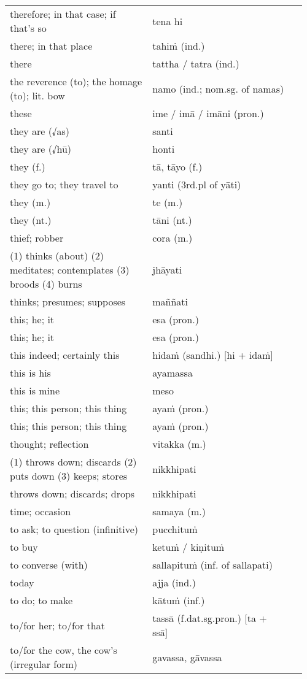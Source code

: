 \documentclass[a5paper]{memoir}
\begin{document}
\begin{longtable}{L{0.48\linewidth} L{0.48\linewidth} H}
therefore; in that case; if that's so & tena hi & \\
there; in that place & tahiṁ (ind.) & \\
there & tattha / tatra (ind.) & \\
the reverence (to); the homage (to); lit. bow & namo (ind.; nom.sg. of namas) & \\
these & ime / imā / imāni (pron.) & \\
they are (√as) & santi & \\
they are (√hū) & honti & \\
they (f.) & tā, tāyo (f.) & \\
they go to; they travel to & yanti (3rd.pl of yāti) & \\
they (m.) & te (m.) & \\
they (nt.) & tāni (nt.) & \\
thief; robber & cora (m.) & \\
(1) thinks (about) (2) meditates; contemplates (3) broods (4) burns & jhāyati & \\
thinks; presumes; supposes & maññati & \\
this; he; it & esa (pron.) & \\
this; he; it & esa (pron.) & \\
this indeed; certainly this & hidaṁ (sandhi.) [hi + idaṁ] & \\
this is his & ayamassa & \\
this is mine & meso & \\
this; this person; this thing & ayaṁ (pron.) & \\
this; this person; this thing & ayaṁ (pron.) & \\
thought; reflection & vitakka (m.) & \\
(1) throws down; discards (2) puts down (3) keeps; stores & nikkhipati & \\
throws down; discards; drops & nikkhipati & \\
time; occasion & samaya (m.) & \\
to ask; to question (infinitive) & pucchituṁ & \\
to buy & ketuṁ / kiṇituṁ & \\
to converse (with) & sallapituṁ (inf. of sallapati) & \\
today & ajja (ind.) & \\
to do; to make & kātuṁ (inf.) & \\
to/for her; to/for that & tassā (f.dat.sg.pron.) [ta + ssā] & \\
to/for the cow, the cow's (irregular form) & gavassa, gāvassa & \\

\end{longtable}
\end{document}
